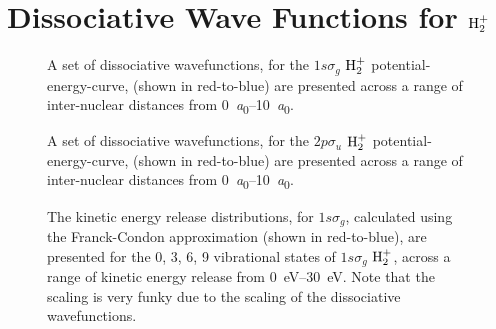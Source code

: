 \documentclass{article}
\begin{document}
\clearpage

\section{Dissociative Wave Functions for $\rm{H}_{2}^{+}$}
\label{sec:dissociative}

\begin{figure}[h]
  \begin{center}
    
  \end{center}
  \caption[Dissociative Wavefunctions for $1s\sigma_{g}$ PEC]{
    A set of dissociative wavefunctions, for the $1s\sigma_{g}$
    $\rm{H}_{2}^{+}$ potential-energy-curve, (shown in red-to-blue) are
    presented across a range of inter-nuclear distances from
    \SIrange{0}{10}{\bohr}.
  }
  \label{fig:1ssg}
\end{figure}

\begin{figure}[h]
  \begin{center}
    
  \end{center}
  \caption[Dissociative Wavefunctions for $2p\sigma_{u}$ PEC]{
    A set of dissociative wavefunctions, for the $2p\sigma_{u}$
    $\rm{H}_{2}^{+}$ potential-energy-curve, (shown in red-to-blue) are
    presented across a range of inter-nuclear distances from
    \SIrange{0}{10}{\bohr}.
  }
  \label{fig:2psu}
\end{figure}

\begin{figure}[h]
  \begin{center}
    
  \end{center}
  \caption[Kinetic Energy Release Distributions for $1s\sigma_{g}$]{
    The kinetic energy release distributions, for $1s\sigma_{g}$, calculated
    using the Franck-Condon approximation (shown in red-to-blue), are presented
    for the 0, 3, 6, 9 vibrational states of $1s\sigma_{g}$ $\rm{H}_{2}^{+}$,
    across a range of kinetic energy release from \SIrange{0}{30}{\eV}.
    Note that the scaling is very funky due to the scaling of the dissociative
    wavefunctions.
  }
  \label{fig:fc-1ssg}
\end{figure}
\end{document}
